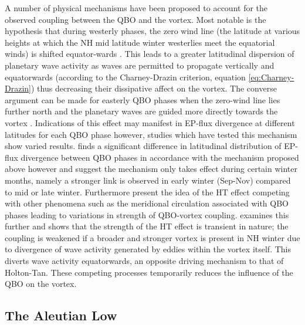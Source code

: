 A number of physical mechanisms have been proposed to account for the observed coupling between the QBO and the vortex. Most notable is the hypothesis that during westerly phases, the zero wind line (the latitude at various heights at which the NH mid latitude winter westerlies meet the equatorial winds) is shifted equator-wards \citep{HoltonJamesRTan1980}. This leads to a greater latitudinal dispersion of planetary wave activity as waves are permitted to propagate vertically and equatorwards (according to the Charney-Drazin criterion, equation \ref{eq:Charney-Drazin}) thus decreasing their dissipative affect on the vortex. The converse argument can be made for easterly QBO phases when the zero-wind line lies further north and the planetary waves are guided more directly towards the vortex \cite{luMechanisms2014c}. Indications of this effect may manifest in EP-flux divergence at different latitudes for each QBO phase however, studies which have tested this mechanism show varied results. \cite{hamiltonEffects1998} finds a significant difference in latitudinal distribution of EP-flux divergence between QBO phases in accordance with the mechanism proposed above however \cite{huTropospheric2002} and \cite{graySolar2004} suggest the mechanism only takes effect during certain winter months, namely a stronger link is observed in early winter (Sep-Nov) compared to mid or late winter. Furthermore \citep{garfinkelDoes2012} present the idea of the HT effect competing with other phenomena such as the meridional circulation associated with QBO phases leading to variations in strength of QBO-vortex coupling. \cite{luMechanisms2014c} examines this further and shows that the strength of the HT effect is transient in nature; the coupling is weakened if a broader and stronger vortex is present in NH winter due to divergence of wave activity generated by eddies within the vortex itself. This diverts wave activity equatorwards, an opposite driving mechanism to that of Holton-Tan. These competing processes temporarily reduces the influence of the QBO on the vortex.

\subsection{The Aleutian Low}
\label{sec:external_influence_AL}

